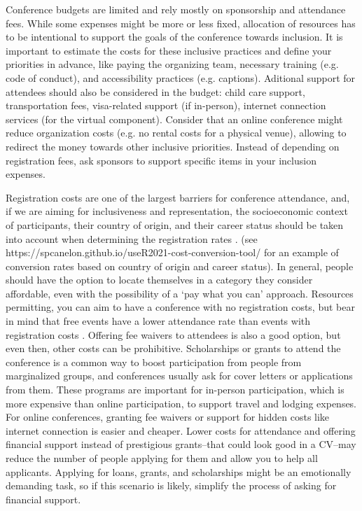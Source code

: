 \documentclass[10pt,letterpaper]{article}
\begin{document}
Conference budgets are limited and rely mostly on sponsorship and attendance fees. 
While some expenses might be more or less fixed, %
allocation of resources has to be intentional to support the goals of the conference towards inclusion. 
It is important to estimate the costs for these inclusive practices and define your priorities in advance, like paying the organizing team, necessary training (e.g. code of conduct), and accessibility practices (e.g. captions). 
Aditional support for attendees should also be considered in the budget: child care support, transportation fees, visa-related support (if in-person), internet connection services (for the virtual component). 
Consider that an online conference might reduce organization costs (e.g. no rental costs for a physical venue), allowing to redirect the money towards other inclusive priorities. 
Instead of depending on registration fees, ask sponsors to support specific items in your inclusion expenses.

Registration costs are one of the largest barriers for conference attendance, and, if we are aiming for inclusiveness and representation, the socioeconomic context of participants, their country of origin, and their career status should be taken into account when determining the registration rates \cite{sarabipourChangingScientificMeetings2021, andalibPostdocQueueLabour2018, kaplanPostdocNot2012}.
(see https://spcanelon.github.io/useR2021-cost-conversion-tool/ for an example of conversion rates based on country of origin and career status). 
In general, people should have the option to locate themselves in a category they consider affordable, even with the possibility of a `pay what you can' approach. 
Resources permitting, you can aim to have a conference with no registration costs, but bear in mind that free events have a lower attendance rate than events with registration costs \cite{eventbrite_ultimate_2017}. 
Offering fee waivers to attendees is also a good option, but even then, other costs can be prohibitive. 
Scholarships or grants to attend the conference is a common way to boost participation from people from marginalized groups, and conferences usually ask for cover letters or applications from them. 
These programs are important for in-person participation, which is more expensive than online participation, to support travel and lodging expenses. 
For online conferences, granting fee waivers or support for hidden costs like internet connection is easier and cheaper. 
Lower costs for attendance and offering financial support instead of prestigious grants--that could look good in a CV--may reduce the number of people applying for them and allow you to help all applicants. 
Applying for loans, grants, and scholarships might be an emotionally demanding task, so if this scenario is likely, simplify the process of asking for financial support. 
\end{document}

